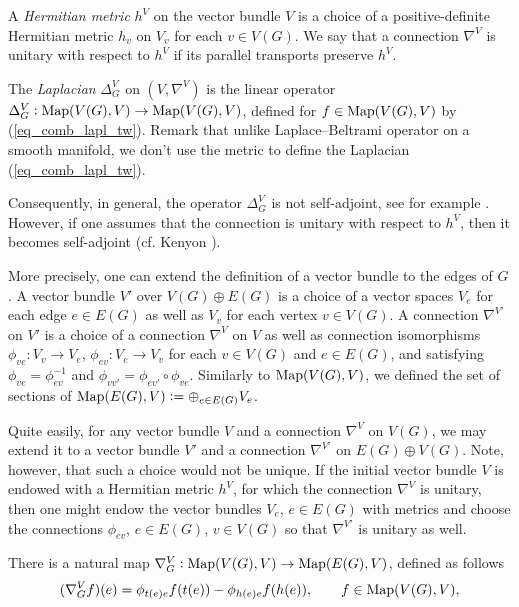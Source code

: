 \documentclass[12pt]{article}
\numberwithin{equation}{section}
\theoremstyle{theorem}
\theoremstyle{definition}
\theoremstyle{remark}
\newcommand{\laplcomp}{\Delta}
\begin{document}
	\par 
	A \textit{Hermitian metric} $h^{V}$ on the vector bundle $V$ is a choice of a positive-definite Hermitian metric $h_{v}$ on $V_v$ for each $v \in V(G)$. We say that a connection $\nabla^{V}$ is unitary with respect to $h^V$ if its parallel transports preserve $h^{V}$.
	\par The \textit{Laplacian} $\laplcomp_G^{V}$ on $(V, \nabla^V)$ is the linear operator $\laplcomp_G^{V} : {\rm{Map}}(V(G), V) \to {\rm{Map}}(V(G), V)$, defined for $f \in {\rm{Map}}(V(G), V)$ by (\ref{eq_comb_lapl_tw}).
	Remark that unlike Laplace–Beltrami operator on a smooth manifold, we don't use the metric to define the Laplacian (\ref{eq_comb_lapl_tw}).
	\par Consequently, in general, the operator $\laplcomp_G^{V}$ is not self-adjoint, see for example \cite[\S 3.2 and equation (1)]{KenyonFlatVecBun}.
	However, if one assumes that the connection is unitary with respect to $h^{V}$, then it becomes self-adjoint (cf. Kenyon \cite[\S 3.3]{KenyonFlatVecBun}). 
	\par 
	More precisely, one can extend the definition of a vector bundle to the edges of $G$. 
	A vector bundle $V'$ over $V(G) \oplus E(G)$ is a choice of a vector spaces $V_e$ for each edge $e \in E(G)$ as well as $V_v$ for each vertex $v \in V(G)$. 
	A connection $\nabla^{V'}$ on $V'$ is a choice of a connection $\nabla^V$ on $V$ as well as connection isomorphisms $\phi_{ve} : V_v \to V_e$, $\phi_{ev} : V_e \to V_v$ for each $v \in V(G)$ and $e \in E(G)$, and satisfying $\phi_{ve} = \phi_{ev}^{-1}$ and
	$\phi_{v v'} = \phi_{ev'} \circ \phi_{ve}$.
	Similarly to ${\rm{Map}}(V(G), V)$, we defined the set of sections of ${\rm{Map}}(E(G), V)  := \oplus_{e \in E(G)} V_e$.
	\par Quite easily, for any vector bundle $V$ and a connection $\nabla^V$ on $V(G)$, we may extend it to a vector bundle $V'$ and a connection $\nabla^{V'}$ on $E(G) \oplus V(G)$.
	Note, however, that such a choice would not be unique.
	If the initial vector bundle $V$ is endowed with a Hermitian metric $h^V$, for which the connection $\nabla^V$ is unitary, then one might endow the vector bundles $V_e$, $e \in E(G)$ with metrics and choose the connections $\phi_{ev}$, $e \in E(G)$, $v \in V(G)$ so that $\nabla^{V'}$ is unitary as well.
	\par There is a natural map $\nabla^V_{G} : {\rm{Map}}(V(G), V) \to {\rm{Map}}(E(G), V)$, defined as follows 
	\begin{equation}
		(\nabla^V_{G} f)(e)
		=
		\phi_{t(e)e} f(t(e)) - \phi_{h(e)e} f(h(e)), 
		\qquad
		f \in {\rm{Map}}(V(G), V), 
	\end{equation}	 
\end{document}
